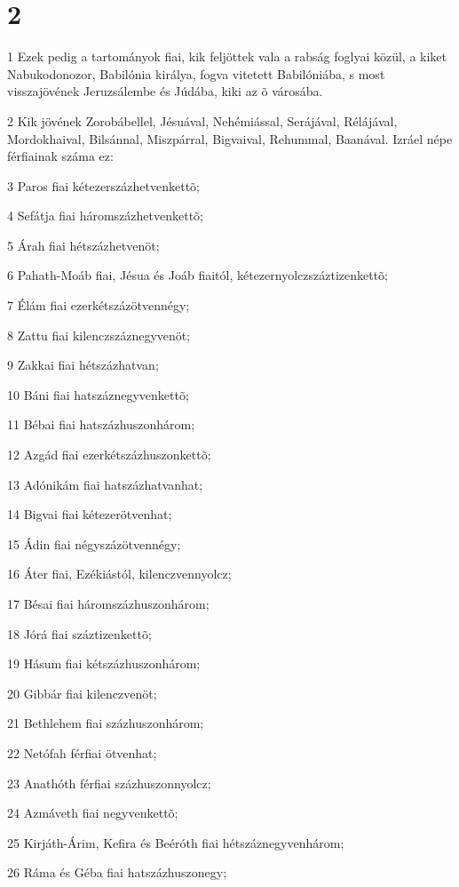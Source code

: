 \chapter{2}

\par 1 Ezek pedig a tartományok fiai, kik feljöttek vala a rabság foglyai közül, a kiket Nabukodonozor, Babilónia királya, fogva vitetett Babilóniába, s most visszajövének Jeruzsálembe és Júdába, kiki az õ városába.
\par 2 Kik jövének Zorobábellel, Jésuával, Nehémiással, Serájával, Rélájával, Mordokhaival, Bilsánnal, Miszpárral, Bigvaival, Rehummal, Baanával. Izráel népe férfiainak száma ez:
\par 3 Paros fiai kétezerszázhetvenkettõ;
\par 4 Sefátja fiai háromszázhetvenkettõ;
\par 5 Árah fiai hétszázhetvenöt;
\par 6 Pahath-Moáb fiai, Jésua és Joáb fiaitól, kétezernyolczszáztizenkettõ;
\par 7 Élám fiai ezerkétszázötvennégy;
\par 8 Zattu fiai kilenczszáznegyvenöt;
\par 9 Zakkai fiai hétszázhatvan;
\par 10 Báni fiai hatszáznegyvenkettõ;
\par 11 Bébai fiai hatszázhuszonhárom;
\par 12 Azgád fiai ezerkétszázhuszonkettõ;
\par 13 Adónikám fiai hatszázhatvanhat;
\par 14 Bigvai fiai kétezerötvenhat;
\par 15 Ádin fiai négyszázötvennégy;
\par 16 Áter fiai, Ezékiástól, kilenczvennyolcz;
\par 17 Bésai fiai háromszázhuszonhárom;
\par 18 Jórá fiai száztizenkettõ;
\par 19 Hásum fiai kétszázhuszonhárom;
\par 20 Gibbár fiai kilenczvenöt;
\par 21 Bethlehem fiai százhuszonhárom;
\par 22 Netófah férfiai ötvenhat;
\par 23 Anathóth férfiai százhuszonnyolcz;
\par 24 Azmáveth fiai negyvenkettõ;
\par 25 Kirjáth-Árim, Kefira és Beéróth fiai hétszáznegyvenhárom;
\par 26 Ráma és Géba fiai hatszázhuszonegy;
